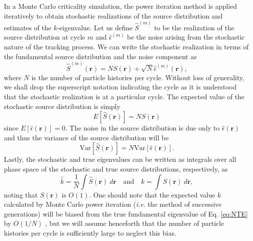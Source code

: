 In a Monte Carlo criticality simulation, the power iteration method is
applied iteratively to obtain stochastic realizations of the source
distribution and estimates of the $k$-eigenvalue. Let us define
$\hat{S}^{(m)}$ to be the realization of the source distribution at
cycle $m$ and $\hat{\epsilon}^{(m)}$ be the noise arising from the
stochastic nature of the tracking process. We can write the stochastic
realization in terms of the fundamental source distribution and the
noise component as \cite{brissenden}
\begin{equation}\label{eq:source}
  \hat{S}^{(m)}(\mathbf{r})= N S(\mathbf{r}) + \sqrt{N}
  \hat{\epsilon}^{(m)}(\mathbf{r}),
\end{equation}
where $N$ is the number of particle histories per cycle. Without loss
of generality, we shall drop the superscript notation indicating the
cycle as it is understood that the stochastic realization is at a
particular cycle. The expected value of the stochastic source
distribution is simply
\begin{equation}
  E \left[ \hat{S}(\mathbf{r})\right] = N S (\mathbf{r})
\end{equation}
since $E \left[ \hat{\epsilon}(\mathbf{r})\right] = 0$. The noise in
the source distribution is due only to $\hat{\epsilon}(\mathbf{r})$
and thus the variance of the source distribution will be
\begin{equation}
  \text{Var} \left[ \hat{S}(\mathbf{r})\right] = N \text{Var} \left[
    \hat{\epsilon}(\mathbf{r}) \right].
\end{equation}
Lastly, the stochastic and true eigenvalues can be written as
integrals over all phase space of the stochastic and true source
distributions, respectively, as
\begin{equation}\label{eq:k_to_source}
  \hat{k} = \frac{1}{N} \int \hat{S}(\mathbf{r}) \: d\mathbf{r} \quad
  \text{and} \quad k = \int S(\mathbf{r}) \: d\mathbf{r},
\end{equation}
noting that $S(\mathbf{r})$ is $O(1)$. One should note that the
expected value $k$ calculated by Monte Carlo power iteration
(\emph{i.e.} the method of successive generations) will be biased from
the true fundamental eigenvalue of Eq. \ref{eq:NTE} by $O(1/N)$
\cite{brissenden}, but we will assume henceforth that the number of
particle histories per cycle is sufficiently large to neglect this
bias.

